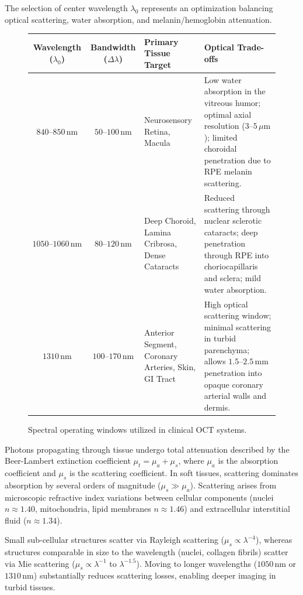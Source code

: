 \documentclass[11pt,a4paper]{article}
\begin{document}
The selection of center wavelength $\lambda_0$ represents an optimization balancing optical scattering, water absorption, and melanin/hemoglobin attenuation.

\begin{figure}[htbp]
\centering
\begin{tabular}{ccp{5.0cm}p{5.5cm}}
\toprule
\textbf{Wavelength ($\lambda_0$)} & \textbf{Bandwidth ($\Delta\lambda$)} & \textbf{Primary Tissue Target} & \textbf{Optical Trade-offs} \\
\midrule
\textbf{$840\text{--}850\,\text{nm}$} & $50\text{--}100\,\text{nm}$ & Neurosensory Retina, Macula & Low water absorption in the vitreous humor; optimal axial resolution ($3\text{--}5\,\mu\text{m}$); limited choroidal penetration due to RPE melanin scattering. \\
\addlinespace
\textbf{$1050\text{--}1060\,\text{nm}$} & $80\text{--}120\,\text{nm}$ & Deep Choroid, Lamina Cribrosa, Dense Cataracts & Reduced scattering through nuclear sclerotic cataracts; deep penetration through RPE into choriocapillaris and sclera; mild water absorption. \\
\addlinespace
\textbf{$1310\,\text{nm}$} & $100\text{--}170\,\text{nm}$ & Anterior Segment, Coronary Arteries, Skin, GI Tract & High optical scattering window; minimal scattering in turbid parenchyma; allows $1.5\text{--}2.5\,\text{mm}$ penetration into opaque coronary arterial walls and dermis. \\
\bottomrule
\end{tabular}
\caption{Spectral operating windows utilized in clinical OCT systems.}
\label{tab:wavelength_windows}
\end{figure}

Photons propagating through tissue undergo total attenuation described by the Beer-Lambert extinction coefficient $\mu_t = \mu_a + \mu_s$, where $\mu_a$ is the absorption coefficient and $\mu_s$ is the scattering coefficient. In soft tissues, scattering dominates absorption by several orders of magnitude ($\mu_s \gg \mu_a$). Scattering arises from microscopic refractive index variations between cellular components (nuclei $n \approx 1.40$, mitochondria, lipid membranes $n \approx 1.46$) and extracellular interstitial fluid ($n \approx 1.34$). 

Small sub-cellular structures scatter via Rayleigh scattering ($\mu_s \propto \lambda^{-4}$), whereas structures comparable in size to the wavelength (nuclei, collagen fibrils) scatter via Mie scattering ($\mu_s \propto \lambda^{-1}$ to $\lambda^{-1.5}$). Moving to longer wavelengths ($1050\,\text{nm}$ or $1310\,\text{nm}$) substantially reduces scattering losses, enabling deeper imaging in turbid tissues.
\end{document}
